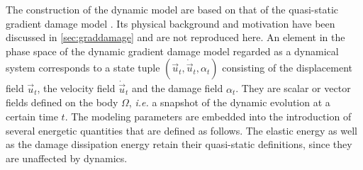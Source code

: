 The construction of the dynamic model are based on that of the quasi-static gradient damage model \cite{PhamMarigo:2010-1,PhamAmorMarigoMaurini:2011}. Its physical background and motivation have been discussed in \cref{sec:graddamage} and are not reproduced here. An element in the phase space of the dynamic gradient damage model regarded as a dynamical system corresponds to a state tuple $(\vec{u}_t,\dot{\vec{u}}_t,\alpha_t)$ consisting of the displacement field $\vec{u}_t$, the velocity field $\dot{\vec{u}}_t$ and the damage field $\alpha_t$. They are scalar or vector fields defined on the body $\Omega$, \emph{i.e.} a snapshot of the dynamic evolution at a certain time $t$. The modeling parameters are embedded into the introduction of several energetic quantities that are defined as follows. The elastic energy as well as the damage dissipation energy retain their quasi-static definitions, since they are unaffected by dynamics.
